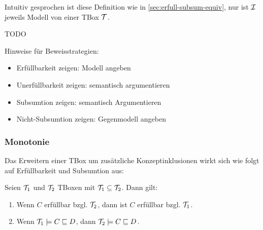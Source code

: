 Intuitiv gesprochen ist diese Definition wie in
\autoref{sec:erfull-subsum-equiv}, nur ist $\mathcal{I}$ jeweils Modell von einer TBox
$\mathcal{T}$.

\begin{tafel}
    TODO
\end{tafel}

Hinweise für Beweisstrategien:
\begin{itemize}
\item Erfüllbarkeit zeigen: Modell angeben
\item Unerfüllbarkeit zeigen: semantisch argumentieren
\item Subsumtion zeigen: semantisch Argumentieren
\item Nicht-Subsumtion zeigen: Gegenmodell angeben
\end{itemize}

\subsubsection{Monotonie}\label{monotonie}
Das Erweitern einer TBox um zusätzliche Konzeptinklusionen wirkt sich wie folgt auf Erfüllbarkeit und Subsumtion aus:

\begin{lemma}
\label{lem:tbox-monoton}
Seien $\mathcal{T}_1$ und $\mathcal{T}_2$ TBoxen mit $\mathcal{T}_1 \subseteq \mathcal{T}_2$. Dann gilt:
\begin{enumerate}
\item
  Wenn $C$ erfüllbar bzgl. $\mathcal{T}_2$, dann ist $C$ erfüllbar bzgl.
  $\mathcal{T}_1$.
\item
  Wenn $\mathcal{T}_1 \models C \sqsubseteq D$, dann
  $\mathcal{T}_2 \models C \sqsubseteq D$.
\end{enumerate}
\end{lemma}

